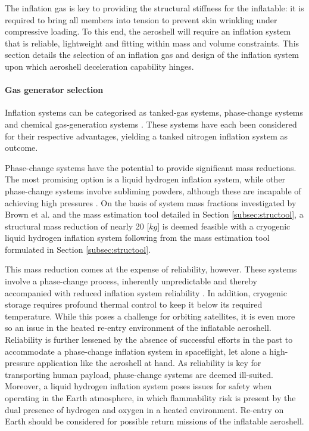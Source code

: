 The inflation gas is key to providing the structural stiffness for the inflatable: it is required to bring all members into tension to prevent skin wrinkling under compressive loading. To this end, the aeroshell will require an inflation system that is reliable, lightweight and fitting within mass and volume constraints. This section details the selection of an inflation gas and design of the inflation system upon which aeroshell deceleration capability hinges.

\paragraph{Gas generator selection}
Inflation systems can be categorised as tanked-gas systems, phase-change systems and chemical gas-generation systems \cite{Jenkins2001}. These systems have each been considered for their respective advantages, yielding a tanked nitrogen inflation system as outcome. 

Phase-change systems have the potential to provide significant mass reductions. The most promising option is a liquid hydrogen inflation system, while other phase-change systems involve subliming powders, although these are incapable of achieving high pressures \cite{Freeland1998}.  On the basis of system mass fractions investigated by Brown et al. \cite{Brown2009} and the mass estimation tool detailed in Section \ref{subsec:structool}, a structural mass reduction of nearly 20 [$kg$] is deemed feasible with a cryogenic liquid hydrogen inflation system following from the mass estimation tool formulated in Section \ref{subsec:structool}. 


This mass reduction comes at the expense of reliability, however. These systems involve a phase-change process, inherently unpredictable and thereby accompanied with reduced inflation system reliability \cite{Jenkins2001}. In addition, cryogenic storage requires profound thermal control to keep it below its required temperature. While this poses a challenge for orbiting satellites, it is even more so an issue in the heated re-entry environment of the inflatable aeroshell. Reliability is further lessened by the absence of successful efforts in the past to accommodate a phase-change inflation system in spaceflight, let alone a high-pressure application like the aeroshell at hand. As reliability is key for transporting human payload, phase-change systems are deemed ill-suited. Moreover, a liquid hydrogen inflation system poses issues for safety when operating in the Earth atmosphere, in which flammability risk is present by the dual presence of hydrogen and oxygen in a heated environment. Re-entry on Earth should be considered for possible return missions of the inflatable aeroshell.


